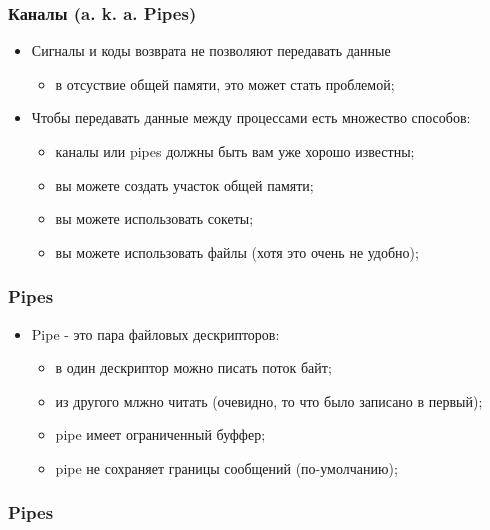 \begin{frame}
\frametitle{Каналы (a. k. a. Pipes)}

\begin{itemize}
  \item<1-> Сигналы и коды возврата не позволяют передавать данные
    \begin{itemize}
      \item в отсуствие общей памяти, это может стать проблемой;
    \end{itemize}
  \item<2-> Чтобы передавать данные между процессами есть множество способов:
    \begin{itemize}
      \item каналы или pipes должны быть вам уже хорошо известны;
      \item вы можете создать участок общей памяти;
      \item вы можете использовать сокеты;
      \item вы можете использовать файлы (хотя это очень не удобно);
    \end{itemize}
\end{itemize}
\end{frame}

\begin{frame}
\frametitle{Pipes}

\begin{itemize}
  \item Pipe - это пара файловых дескрипторов:
    \begin{itemize}
      \item в один дескриптор можно писать поток байт;
      \item из другого млжно читать (очевидно, то что было записано в первый);
      \item pipe имеет ограниченный буффер;
      \item pipe не сохраняет границы сообщений (по-умолчанию);
    \end{itemize}
\end{itemize}
\end{frame}

\begin{frame}[fragile]
\frametitle{Pipes}

\end{frame}

